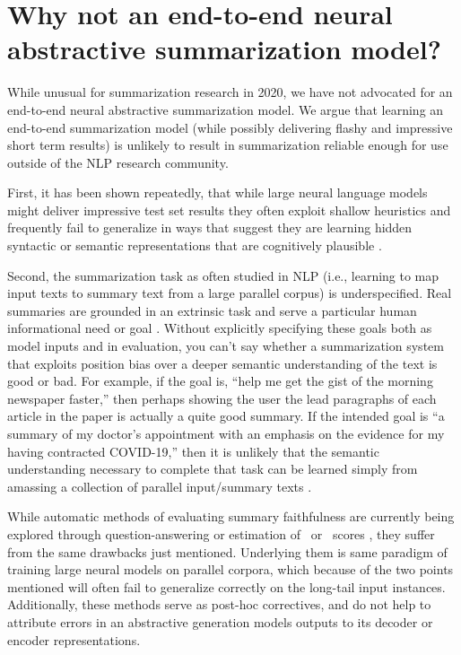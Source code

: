 \section{Why not an end-to-end neural abstractive summarization model?}

While unusual for summarization research in 2020, we have not advocated for an
end-to-end neural abstractive summarization model.  We argue that learning an
end-to-end summarization model (while possibly delivering flashy and impressive
short term results) is unlikely to result in summarization reliable enough for
use outside of the NLP research community.

First, it has been shown repeatedly, that while large neural language models
might deliver impressive test set results they often exploit shallow heuristics
and frequently fail to generalize in ways that suggest they are learning hidden
syntactic or semantic representations that are cognitively plausible
\citep{fodor1988,marcus2003,lake18,mccoy2019,linzen2020}.

Second, the summarization task as often studied in NLP (i.e., learning to map
input texts to summary text from a large parallel corpus) is underspecified.
Real summaries are grounded in an extrinsic task and serve a particular human
informational need or goal \citep{jones1999,mckeown2005}.  Without explicitly
specifying these goals both as model inputs and in evaluation, you can't say
whether a summarization system that exploits position bias over a deeper
semantic understanding of the text is good or bad. For example, if the goal is,
``help me get the gist of the morning newspaper faster,'' then perhaps showing
the user the lead paragraphs of each article in the paper is actually a quite
good summary. If the intended goal is ``a summary of my doctor's appointment
with an emphasis on the evidence for my having contracted COVID-19,'' then it
is unlikely that the semantic understanding necessary to complete that task can
be learned simply from amassing a collection of parallel input/summary texts
\citep{bender2020,bisk2020}.

While automatic methods of evaluating summary faithfulness are currently being
explored through question-answering \citep{wang2020b,durmus2020} or estimation
of \rouge~or \bleu~scores \citep{zhang2020,sellam2020}, they suffer from the
same drawbacks just mentioned.  Underlying them is same paradigm of training
large neural models on parallel corpora, which because of the two points
mentioned will often fail to generalize correctly on the long-tail input
instances.  Additionally, these methods serve as post-hoc correctives, and do
not help to attribute errors in an abstractive generation models outputs to its
decoder or encoder representations.
